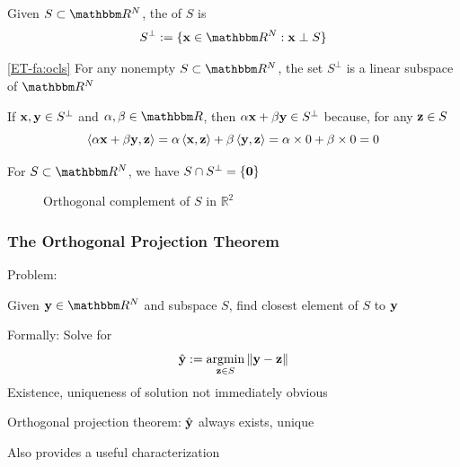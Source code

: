 \begin{frame}
    
    \vspace{2em}
    Given $S \subset \RR^N$, the 
    of $S$ is
    \begin{equation*}
        S^{\perp} := \setntn{\boldx \in \RR^N}{\boldx \perp S}
    \end{equation*}
    
    \vspace{.5em}
    \Fact\eqref{ET-fa:ocls}
    For any nonempty $S \subset \RR^N$, the set $S^{\perp}$ is
    a linear subspace of $\RR^N$
    
    \Prf 
    If ${\mathbf x}, {\mathbf y} \in S^{\perp}$ and $\alpha, \beta \in \RR$, then 
    $\alpha {\mathbf x} + \beta {\mathbf y} \in S^{\perp}$
    because, for any ${\mathbf z} \in S$
    \begin{equation*}
        \left\langle{\alpha  {\mathbf x} + \beta  {\mathbf y} ,  {\mathbf z} }\right\rangle
         = \alpha \left\langle{  {\mathbf x} ,  {\mathbf z} }\right\rangle + \beta \left\langle{ {\mathbf y} ,  {\mathbf z} }\right\rangle
         = \alpha \times 0  + \beta \times 0 
         = 0
    \end{equation*}
    
    \vspace{.5em}
    \Fact{\eqref{ET-fa:scscez}}
    For $S \subset \RR^N$, we have $S \cap S^{\perp} =
    \{{\mathbf 0}\}$
    
\end{frame}
   
\begin{frame}

    \vspace{2em}
    \begin{figure}
       \begin{center}
        \resizebox{7.5cm}{!}{}
        \caption{\label{f:orth_comp} Orthogonal complement of $S$ in $\mathbb{R}^{2}$}
       \end{center}
    \end{figure}
    
\end{frame}

\begin{frame}\frametitle{The Orthogonal Projection Theorem}
    
    \vspace{2em}
    Problem:
    \begin{center}
        Given $\boldy \in \RR^N$ and subspace $S$, find closest element of $S$ 
        to ${\mathbf y}$
    \end{center}
    
    Formally: Solve for
    \begin{equation}\label{eq:mproj}
        \hboldy := \argmin_{\boldz \in S} \|\boldy - \boldz\|
    \end{equation}
    Existence, uniqueness of solution not immediately obvious

    Orthogonal projection theorem: $\hat {\mathbf y}$ always exists, unique

    Also provides a useful characterization

\end{frame}

